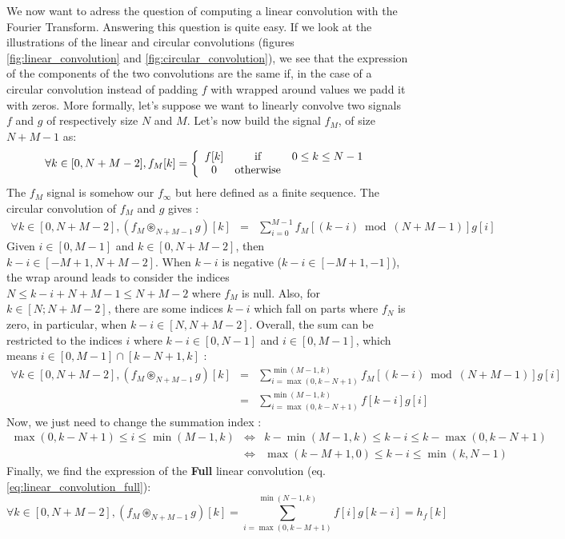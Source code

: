 \documentclass[a4paper,10pt,twoside]{article}
\begin{document}
We now want to adress the question of computing a linear convolution with the Fourier Transform. Answering this question is quite easy. If we look at the illustrations of the linear and circular convolutions (figures \ref{fig:linear_convolution} and \ref{fig:circular_convolution}), we see that the expression of the components of the two convolutions are the same if, in the case of a circular convolution instead of padding $f$ with wrapped around values we padd it with zeros. More formally, let's suppose we want to linearly convolve two signals $f$ and $g$ of respectively size $N$ and $M$. Let's now build the signal $f_M$, of size $N+M-1$ as:
\begin{equation*}
\forall k \in [0,N+M-2], f_M[k] = \left\lbrace
\begin{array}{ccc}
f[k]     & \mbox{if} & 0 \leq k \leq N-1\\
0  & \mbox{otherwise}\\
\end{array}\right. \\
\end{equation*}
The $f_M$ signal is somehow our $f_\infty$ but here defined as a finite sequence. The circular convolution of $f_M$ and $g$ gives :
\begin{eqnarray}
\forall k \in [0,N+M-2], (f_M \circledast_{N+M-1} g)[k] &=& \sum_{i=0}^{M-1} f_M[(k-i) \bmod (N+M-1)] g[i]
\end{eqnarray}
Given $i \in [0,M-1]$ and $k \in [0,N+M-2]$, then $k-i \in [-M+1, N+M-2]$. When $k-i$ is negative ($k-i \in [-M+1,-1]$), the wrap around leads to consider the indices $N \leq k-i+N+M-1 \leq N+M-2$ where $f_M$ is null. Also, for $k \in [N;N+M-2]$, there are some indices $k-i$ which fall on parts where $f_N$ is zero, in particular, when $k-i \in [N,N+M-2]$. Overall, the sum can be restricted to the indices $i$ where $k-i \in [0, N-1]$ and $i \in [0,M-1]$, which means $i \in [0,M-1] \cap [k-N+1,k]$ :
\begin{eqnarray}
\forall k \in [0,N+M-2], (f_M \circledast_{N+M-1} g)[k] &=& \sum_{i=\max(0, k-N+1)}^{\min(M-1,k)} f_M[(k-i) \bmod (N+M-1)] g[i]\\
							&=& \sum_{i=\max(0, k-N+1)}^{\min(M-1,k)} f[k-i] g[i]
\end{eqnarray}
Now, we just need to change the summation index :
\begin{eqnarray}
\nonumber \max(0,k-N+1) \leq i \leq \min(M-1,k) &\Longleftrightarrow& k - \min(M-1,k) \leq k-i \leq k - \max(0,k-N+1)\\
\nonumber                                       &\Longleftrightarrow& \max(k-M+1, 0) \leq k-i \leq \min(k, N-1)
\end{eqnarray}
Finally, we find the expression of the \textbf{Full} linear convolution (eq. \ref{eq:linear_convolution_full}):
\begin{equation*}
\forall k \in [0,N+M-2], (f_M \circledast_{N+M-1} g)[k] = \sum_{i=\max(0, k-M+1)}^{\min(N-1,k)} f[i] g[k-i] = h_f[k]
\end{equation*}
\end{document}
